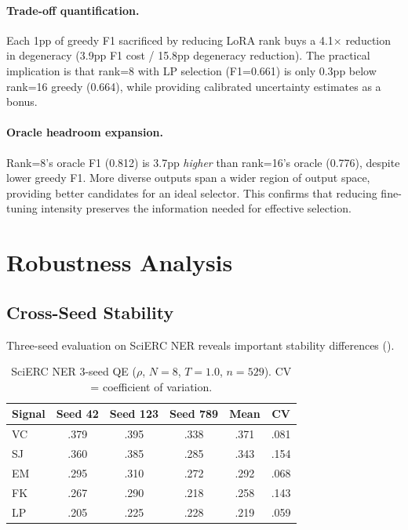 \documentclass[11pt,a4paper]{article}
\begin{document}
\paragraph{Trade-off quantification.}
Each 1pp of greedy F1 sacrificed by reducing LoRA rank buys a 4.1$\times$ reduction in degeneracy (3.9pp F1 cost / 15.8pp degeneracy reduction).
The practical implication is that rank=8 with LP selection (F1=0.661) is only 0.3pp below rank=16 greedy (0.664), while providing calibrated uncertainty estimates as a bonus.

\paragraph{Oracle headroom expansion.}
Rank=8's oracle F1 (0.812) is 3.7pp \emph{higher} than rank=16's oracle (0.776), despite lower greedy F1.
More diverse outputs span a wider region of output space, providing better candidates for an ideal selector.
This confirms that reducing fine-tuning intensity preserves the information needed for effective selection.

\section{Robustness Analysis}

\subsection{Cross-Seed Stability}

Three-seed evaluation on SciERC NER reveals important stability differences ().

\begin{table}[t]
\centering
\small
\caption{SciERC NER 3-seed QE ($\rho$, $N{=}8$, $T{=}1.0$, $n{=}529$). CV = coefficient of variation.}
\label{tab:seeds}
\begin{tabular}{lccccc}
\toprule
\textbf{Signal} & \textbf{Seed 42} & \textbf{Seed 123} & \textbf{Seed 789} & \textbf{Mean} & \textbf{CV} \\
\midrule
VC  & .379 & .395 & .338 & .371 & .081 \\
SJ  & .360 & .385 & .285 & .343 & .154 \\
EM  & .295 & .310 & .272 & .292 & .068 \\
FK  & .267 & .290 & .218 & .258 & .143 \\
LP  & .205 & .225 & .228 & .219 & .059 \\
\bottomrule
\end{tabular}
\end{table}
\end{document}
